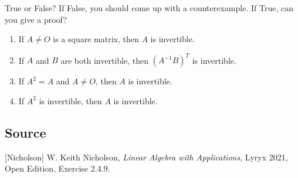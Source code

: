 \documentclass{ximera}
\author{}
\begin{document}
\begin{exercise}

True or False?  If False, you should come up with a counterexample.  If True, can you give a proof?

 \begin{enumerate}
     \item If $A \neq O$ is a square matrix, then $A$ is invertible.

 \begin{multipleChoice}
 \end{multipleChoice}

 \item If $A$ and $B$ are both invertible, then $(A^{-1}B)^{T}$ is invertible.

 \begin{multipleChoice}
 \end{multipleChoice}

 \item If $A^{2} = A$ and $A \neq O$, then $A$ is invertible.

 \begin{multipleChoice}
 \end{multipleChoice}

 \item If $A^{2}$ is invertible, then $A$ is invertible.

 \begin{multipleChoice}
 \end{multipleChoice}


 \end{enumerate}

 
\end{exercise}

\subsection*{Source}
[Nicholson] W. Keith Nicholson, {\it Linear Algebra with Applications}, Lyryx 2021, Open Edition, Exercise 2.4.9.
\end{document}

